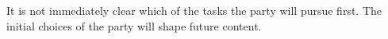 It is not immediately clear which of the tasks the party will pursue first.
The initial choices of the party will shape future content.
